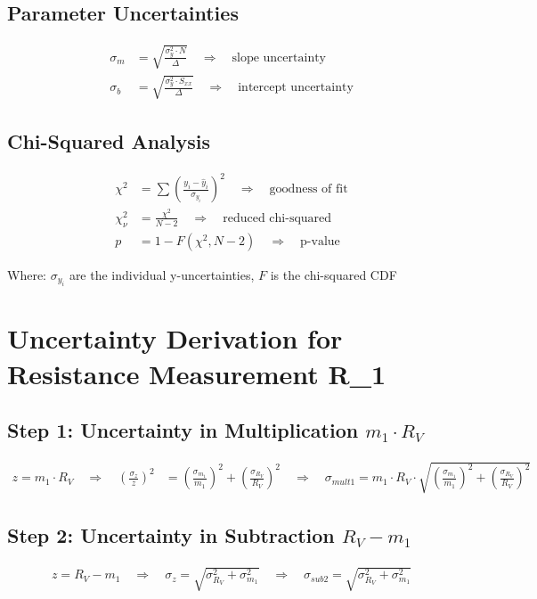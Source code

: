 \documentclass{article} %
\begin{document}
\subsection*{Parameter Uncertainties}
\begin{align*}
\sigma_m &= \sqrt{\frac{\sigma_y^2 \cdot N}{\Delta}} \quad \Rightarrow \quad \text{slope uncertainty} \\
\sigma_b &= \sqrt{\frac{\sigma_y^2 \cdot S_{xx}}{\Delta}} \quad \Rightarrow \quad \text{intercept uncertainty}
\end{align*}

\subsection*{Chi-Squared Analysis}
\begin{align*}
\chi^2 &= \sum \left(\frac{y_i - \hat{y}_i}{\sigma_{y_i}}\right)^2 \quad \Rightarrow \quad \text{goodness of fit} \\
\chi_\nu^2 &= \frac{\chi^2}{N-2} \quad \Rightarrow \quad \text{reduced chi-squared} \\
p &= 1 - F(\chi^2, N-2) \quad \Rightarrow \quad \text{p-value}
\end{align*}

Where: $\sigma_{y_i}$ are the individual y-uncertainties, $F$ is the chi-squared CDF

\newpage

\section{Uncertainty Derivation for Resistance Measurement R\_1}
\label{app:d_R1_uncertainty}

\subsection*{Step 1: Uncertainty in Multiplication $m_1 \cdot R_V$}
\begin{align*}
z = m_1 \cdot R_V \quad \Rightarrow \quad \left(\frac{\sigma_z}{z}\right)^2 &= \left(\frac{\sigma_{m_1}}{m_1}\right)^2 + \left(\frac{\sigma_{R_V}}{R_V}\right)^2 \quad \Rightarrow \quad \sigma_{mult1} = m_1 \cdot R_V \cdot \sqrt{\left(\frac{\sigma_{m_1}}{m_1}\right)^2 + \left(\frac{\sigma_{R_V}}{R_V}\right)^2}
\end{align*}

\subsection*{Step 2: Uncertainty in Subtraction $R_V - m_1$}
\begin{align*}
z = R_V - m_1 \quad \Rightarrow \quad \sigma_z = \sqrt{\sigma_{R_V}^2 + \sigma_{m_1}^2} \quad \Rightarrow \quad \sigma_{sub2} = \sqrt{\sigma_{R_V}^2 + \sigma_{m_1}^2}
\end{align*}
\end{document}
